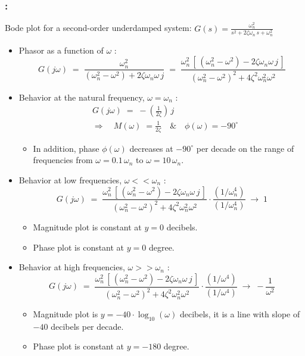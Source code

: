 \documentclass[ 10pt, xcolor = dvipsnames]{beamer}
\begin{document}
\begin{frame}[allowframebreaks]
\frametitle{\insertsection: \insertsubsection}

Bode plot for a second-order underdamped system: $\displaystyle G(s) = \frac{\omega_n^2}{s^2 + 2 \zeta \omega_n \, s + \omega_n^2}$
\begin{itemize}
\item Phasor as a function of $\omega$ : 
\[
G(j\omega) \; = \; 
\frac{\omega_n^2}{(\omega_n^2 -\omega^2) + 2 \zeta \omega_n \omega \, j} \; = \; 
\frac{\omega_n^2 \, [ \, (\omega_n^2 -\omega^2) - 2 \zeta \omega_n \omega \, j \, ]  }{(\omega_n^2 -\omega^2)^2 + 4 \zeta^2 \omega_n^2 \omega^2}
\]
\item Behavior at the natural frequency, \ie $\omega = \omega_n$ :
\begin{align*}
& G(j\omega) \; = \; - \left( \frac{1}{2 \zeta} \right) \, j \\[1ex]
& \Longrightarrow \quad
M(\omega) \; = \frac{1}{2 \zeta} \quad \& \quad \phi(\omega) = -90^{\circ}
\end{align*}
\halfcut
\begin{itemize}
\item In addition, phase $\phi(\omega)$ decreases at $-90^{\circ}$ per decade on the range of frequencies from $\omega = 0.1 \, \omega_n$ to $\omega = 10 \, \omega_n$. 
\end{itemize}
\framebreak

\item Behavior at low frequencies, \ie $\omega << \omega_n$ :
\[
G(j\omega) \; = \;
\frac{\omega_n^2 \, [ \, (\omega_n^2 -\omega^2) - 2 \zeta \omega_n \omega \, j \, ]  }{(\omega_n^2 -\omega^2)^2 + 4 \zeta^2 \omega_n^2 \omega^2} \cdot
\frac{ ( 1 / \omega_n^4 ) }{ ( 1 / \omega_n^4 ) }
\; \longrightarrow \; 1
\]
\fullcut
\begin{itemize}
\item Magnitude plot is constant at $y = 0$ decibels. 
\item Phase plot is constant at $y = 0$ degree. 
\end{itemize}
\halfskip
\item Behavior at high frequencies, \ie $\omega >> \omega_n$ :
\[
G(j\omega) \; = \;
\frac{\omega_n^2 \, [ \, (\omega_n^2 -\omega^2) - 2 \zeta \omega_n \omega \, j \, ]  }{(\omega_n^2 -\omega^2)^2 + 4 \zeta^2 \omega_n^2 \omega^2} \cdot
\frac{ ( 1 / \omega^4 ) }{ ( 1 / \omega^4 ) }
\; \longrightarrow \; -\frac{1}{\omega^2}
\]
\fullcut
\begin{itemize}
\item Magnitude plot is $y = -40 \cdot \log_{10}(\omega)$ decibels, \ie it is a line with slope of $-40$ decibels per decade. 
\item Phase plot is constant at $y = -180$ degree. 
\end{itemize}
\framebreak


\end{itemize}
\end{frame}
\end{document}
